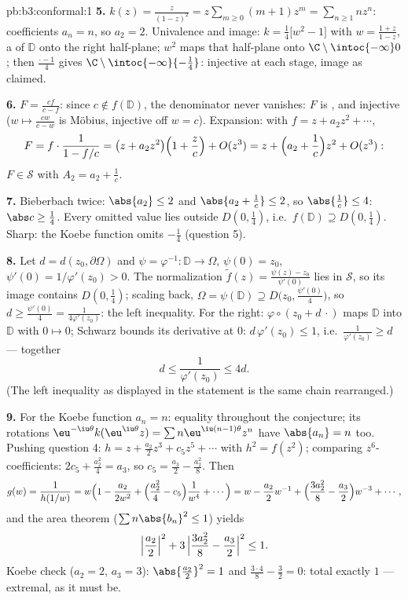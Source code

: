\begin{solution}{pb:b3:conformal:1}
\textbf{5.} $k(z) = \frac z{(1-z)^2} = z\sum_{m\geq0}(m +
1)z^m = \sum_{n\geq1}nz^n$: coefficients $a_n = n$, so $a_2 =
2$. Univalence and image: $k = \frac14\bigl[w^2 - 1\bigr]$
with $w = \frac{1 + z}{1 - z}$, a  of $\mathbb D$
onto the right half-plane; $w^2$ maps that half-plane
 onto $\C\setminus\intoc{-\infty}0$; then
$\frac{\cdot - 1}4$ gives
$\C\setminus\intoc{-\infty}{-\frac14}$: injective at each
stage, image as claimed.

\textbf{6.} $F = \frac{cf}{c - f}$: since $c \notin f(\mathbb
D)$, the denominator never vanishes: $F$ is , and
injective ($w \mapsto \frac{cw}{c - w}$ is M\"obius, injective
off $w = c$). Expansion: with $f = z + a_2z^2 + \cdots$,
\[
F = f\cdot\frac1{1 - f/c} = \bigl(z + a_2z^2\bigr)\Bigl(1 +
\frac zc\Bigr) + O(z^3)
= z + \Bigl(a_2 + \frac1c\Bigr)z^2 + O(z^3):
\]
$F \in \mathcal S$ with $A_2 = a_2 + \frac1c$.

\textbf{7.} Bieberbach twice: $\abs{a_2} \leq 2$ and
$\abs{a_2 + \frac1c} \leq 2$, so $\abs{\frac1c} \leq 4$:
$\abs c \geq \frac14$. Every omitted value lies outside
$D(0,\frac14)$, i.e.\ $f(\mathbb D) \supseteq D(0, \frac14)$.
Sharp: the Koebe function omits $-\frac14$ (question 5).

\textbf{8.} Let $d = d(z_0, \partial\Omega)$ and $\psi =
\varphi^{-1} \colon \mathbb D \to \Omega$, $\psi(0) = z_0$,
$\psi'(0) = 1/\varphi'(z_0) > 0$. The normalization $\tilde
f(z) = \frac{\psi(z) - z_0}{\psi'(0)}$ lies in $\mathcal S$,
so its image contains $D(0, \frac14)$; scaling back,
$\Omega = \psi(\mathbb D) \supseteq D\bigl(z_0,
\tfrac{\psi'(0)}4\bigr)$, so $d \geq \frac{\psi'(0)}4 =
\frac1{4\varphi'(z_0)}$: the left inequality. For the right: $\varphi\circ(z_0 + d\,\cdot)$
maps $\mathbb D$ into $\mathbb D$ with $0 \mapsto 0$; Schwarz
bounds its derivative at $0$: $d\,\varphi'(z_0) \leq 1$, i.e.\
$\frac1{\varphi'(z_0)} \geq d$ --- together
\[
d \leq \frac1{\varphi'(z_0)} \leq 4d .
\]
(The left inequality as displayed in the statement is the
same chain rearranged.)

\textbf{9.} For the Koebe function $a_n = n$: equality
throughout the conjecture; its rotations
$\eu^{-\iu\theta}k(\eu^{\iu\theta}z) = \sum
n\eu^{\iu(n-1)\theta}z^n$ have $\abs{a_n} = n$ too. Pushing
question 4: $h = z + \frac{a_2}2z^3 + c_5z^5 + \cdots$ with
$h^2 = f(z^2)$; comparing $z^6$-coefficients: $2c_5 +
\frac{a_2^2}4 = a_3$, so $c_5 = \frac{a_3}2 -
\frac{a_2^2}8$. Then
\[
g(w) = \frac1{h(1/w)} = w\Bigl(1 - \frac{a_2}{2w^2} +
\Bigl(\frac{a_2^2}4 - c_5\Bigr)\frac1{w^4} + \cdots\Bigr)
= w - \frac{a_2}2w^{-1} + \Bigl(\frac{3a_2^2}8 -
\frac{a_3}2\Bigr)w^{-3} + \cdots,
\]
and the area theorem ($\sum n\abs{b_n}^2 \leq 1$) yields
\[
\Bigl|\frac{a_2}2\Bigr|^2 + 3\,\Bigl|\frac{3a_2^2}8 -
\frac{a_3}2\Bigr|^2 \leq 1 .
\]
Koebe check ($a_2 = 2$, $a_3 = 3$): $\abs{\frac{a_2}2}^2 = 1$
and $\frac{3\cdot4}8 - \frac32 = 0$: total exactly $1$ ---
extremal, as it must be.


\end{solution}
